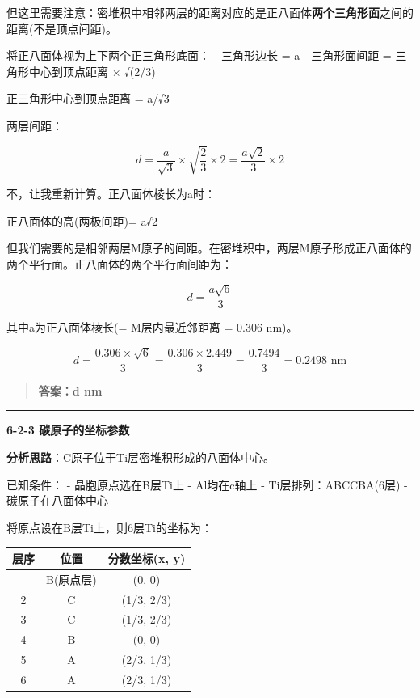 但这里需要注意：密堆积中相邻两层的距离对应的是正八面体\textbf{两个三角形面}之间的距离(不是顶点间距)。

将正八面体视为上下两个正三角形底面：
- 三角形边长 = a
- 三角形面间距 = 三角形中心到顶点距离 × √(2/3)

正三角形中心到顶点距离 = a/√3

两层间距：

\[d = \frac{a}{\sqrt{3}} \times \sqrt{\frac{2}{3}} \times 2 = \frac{a\sqrt{2}}{3} \times 2\]

不，让我重新计算。正八面体棱长为a时：

正八面体的高(两极间距)= a√2

但我们需要的是相邻两层M原子的间距。在密堆积中，两层M原子形成正八面体的两个平行面。正八面体的两个平行面间距为：

\[d = \frac{a\sqrt{6}}{3}\]

其中a为正八面体棱长(= M层内最近邻距离 = 0.306 nm)。

\[d = \frac{0.306 \times \sqrt{6}}{3} = \frac{0.306 \times 2.449}{3} = \frac{0.7494}{3} = 0.2498 \text{ nm}\]

\begin{quote}
\textbf{答案：d  nm}
\end{quote}

\begin{center}\rule{0.5\linewidth}{0.5pt}\end{center}

\textbf{6-2-3 碳原子的坐标参数}

\textbf{分析思路}：C原子位于Ti层密堆积形成的八面体中心。

已知条件：
- 晶胞原点选在B层Ti上
- Al均在c轴上
- Ti层排列：ABCCBA(6层)
- 碳原子在八面体中心

将原点设在B层Ti上，则6层Ti的坐标为：

{\def\LTcaptype{none} %
\begin{longtable}[]{@{}ccc@{}}
\toprule\noalign{}
层序 & 位置 & 分数坐标(x, y) \\
\midrule\noalign{}
\endhead
\bottomrule\noalign{}
\endlastfoot
1 & B(原点层) & (0, 0) \\
2 & C & (1/3, 2/3) \\
3 & C & (1/3, 2/3) \\
4 & B & (0, 0) \\
5 & A & (2/3, 1/3) \\
6 & A & (2/3, 1/3) \\
\end{longtable}
}

